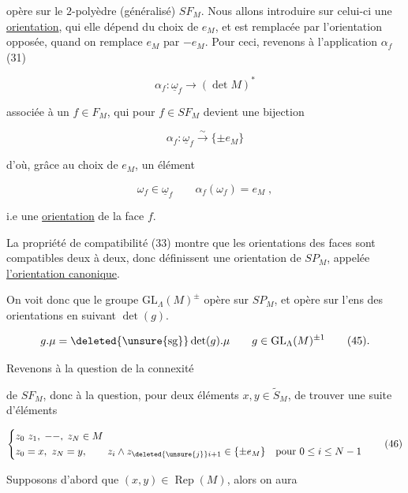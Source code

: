 opère sur le $2$-polyèdre (généralisé) $SF_M$. Nous allons introduire sur celui-ci une \uline{orientation}, qui elle dépend du choix de $e_M$, et est remplacée par l'orientation opposée, quand on remplace $e_M$ par $-e_M$. Pour ceci, revenons à l'application $\alpha_f$ (31)

\[
\alpha_f:\underline{\omega}_f\longrightarrow(\det M)^*
\]


associée à un $f\in F_M$, qui pour $f\in SF_M$ devient une bijection

\[
\alpha_f:\underline{\omega}_f\overset{\sim}{\longrightarrow}\{\pm e_M\}\tag*{(43)}
\]

d'où, grâce au choix de $e_M$, un élément

\[
\omega_f\in\underline{\omega}_f\qquad\alpha_f(\omega_f)=e_M\;,\tag*{(44)}
\]

 i.e une \uline{orientation}  de la face $f$.

La propriété de compatibilité (33) montre que les orientations des faces  sont compatibles deux à deux, donc définissent une orientation \inserted{$\mu$} de $SP_M$, appelée \uline{l'orientation canonique}.

On voit donc que le groupe $\mathrm{GL}_\Lambda(M)^\pm$ opère sur $SP_M$, et opère sur l'ens des orientations en   suivant $\det(g)$.

\[
g.\mu=\deleted{\unsure{\operatorname{sg}}}\det(g).\mu\qquad g\in\mathrm{GL}_\Lambda(M)^{\pm1}\tag*{(45).}
\]

Revenons  à la question de la connexité



de $SF_M$, donc à la question, pour deux éléments $x,y\in\widetilde{S}_M$, de trouver une suite d'éléments

\[
\left\{\begin{aligned}
&z_0\ z_1,\;--,\;z_N\in M\\
&z_0=x,\ z_N=y,\qquad z_i\wedge z_{\deleted{\unsure{j}}i+1}\in\{\pm e_M\}\quad\text{pour }0\leq i\leq N-1
\end{aligned}\right.\tag*{(46)}
\]

Supposons d'abord que $(x,y)\in\operatorname{Rep}(M)$, alors on aura

